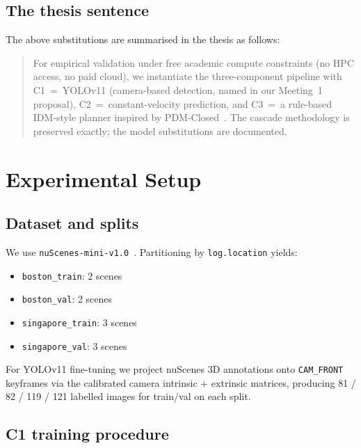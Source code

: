 \documentclass[11pt,a4paper]{article}
\begin{document}
\subsection{The thesis sentence}

The above substitutions are summarised in the thesis as follows:

\begin{quote}
\small For empirical validation under free academic compute
constraints (no HPC access, no paid cloud), we instantiate the
three-component pipeline with C1~=~YOLOv11 (camera-based detection,
named in our Meeting~1 proposal), C2~=~constant-velocity prediction,
and C3~=~a rule-based IDM-style planner inspired by
PDM-Closed~\cite{dauner2023parting}. The cascade methodology is
preserved exactly; the model substitutions are documented.
\end{quote}

\section{Experimental Setup}
\label{sec:setup}

\subsection{Dataset and splits}

We use \texttt{nuScenes-mini-v1.0}~\cite{caesar2020nuscenes}.
Partitioning by \texttt{log.location} yields:
\begin{itemize}[noitemsep]
    \item \texttt{boston\_train}: 2 scenes
    \item \texttt{boston\_val}:   2 scenes
    \item \texttt{singapore\_train}: 3 scenes
    \item \texttt{singapore\_val}:   3 scenes
\end{itemize}
For YOLOv11 fine-tuning we project nuScenes 3D annotations onto
\texttt{CAM\_FRONT} keyframes via the calibrated camera intrinsic +
extrinsic matrices, producing 81 / 82 / 119 / 121 labelled images for
train/val on each split.

\subsection{C1 training procedure}
\end{document}
